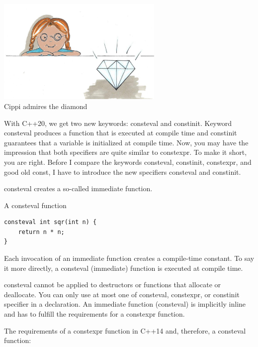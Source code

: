 \begin{center}
\includegraphics[width=0.6\textwidth]{content/3/chapter4/images/36.png}\\
Cippi admires the diamond
\end{center}

With C++20, we get two new keywords: consteval and constinit. Keyword consteval produces a function that is executed at compile time and constinit guarantees that a variable is initialized at compile time. Now, you may have the impression that both specifiers are quite similar to constexpr. To make it short, you are right. Before I compare the keywords consteval, constinit, constexpr, and good old const, I have to introduce the new specifiers consteval and constinit.



consteval creates a so-called immediate function.

\noindent
A consteval function
\begin{lstlisting}[style=styleCXX]
consteval int sqr(int n) {
	return n * n;
}
\end{lstlisting}

Each invocation of an immediate function creates a compile-time constant. To say it more directly, a consteval (immediate) function is executed at compile time.

consteval cannot be applied to destructors or functions that allocate or deallocate. You can only use at most one of consteval, constexpr, or constinit specifier in a declaration. An immediate function (consteval) is implicitly inline and has to fulfill the requirements for a constexpr function.

The requirements of a constexpr function in C++14 and, therefore, a consteval function:

